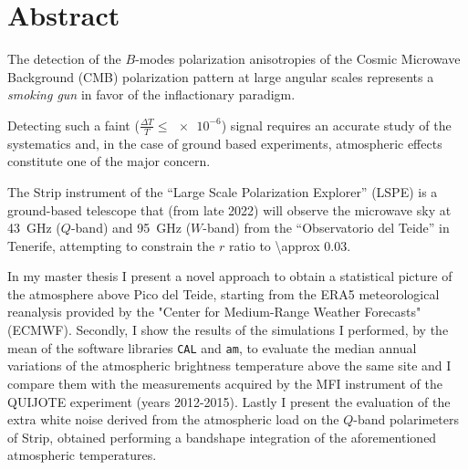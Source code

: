 \chapter{\centering Abstract}
The detection of the $B$-modes polarization anisotropies of the Cosmic
Microwave Background (CMB) polarization pattern at large angular scales
represents a \emph{smoking gun} in favor of the inflactionary paradigm.

Detecting such a faint ($\frac{\Delta T}{T} \leq \num{e-6}$) signal 
requires an accurate study of the systematics and, in the case of ground 
based experiments, atmospheric effects constitute one of the major concern.  

The Strip instrument of the ``Large Scale Polarization Explorer'' (LSPE) is
a ground-based telescope that (from late 2022) will observe the microwave
sky at \SI{43}{\giga\hertz} ($Q$-band) and \SI{95}{\giga\hertz} ($W$-band)
from the ``Observatorio del Teide'' in Tenerife,  attempting to constrain
the $r$ ratio to \num{\approx 0.03}.

In my master thesis I present a novel approach to obtain a statistical
picture of the atmosphere above Pico del Teide, starting from the ERA5
meteorological reanalysis provided by the "Center for Medium-Range Weather
Forecasts" (ECMWF). Secondly, I show the results of the simulations I
performed, by the mean of the software libraries \texttt{CAL} and
\texttt{am}, to evaluate the median annual variations of the atmospheric
brightness temperature above the same site and I compare them with the
measurements acquired by the MFI instrument of the QUIJOTE experiment
(years 2012-2015). Lastly I present the evaluation of the extra white noise
derived from the atmospheric load on the $Q$-band polarimeters of Strip,
obtained performing a bandshape integration of the aforementioned
atmospheric temperatures.
